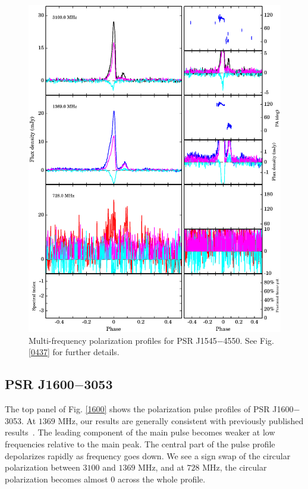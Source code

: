 \documentclass[useAMS,usenatbib]{mn2e}
\begin{document}
\begin{figure}
\begin{center}
\includegraphics[width=6 in]{1545.ps}
\caption{Multi-frequency polarization profiles for PSR J1545$-$4550. 
See Fig. \ref{0437} for further details.}
\label{1545}
\end{center}
\end{figure}

\subsection{PSR J1600$-$3053}

The top panel of Fig. \ref{1600} shows the polarization pulse profiles of 
PSR J1600$-$3053.
%
At $1369$ MHz, our results are generally consistent with previously published
results~\citep{Ord04,Yan11}.
%
The leading component of the main pulse becomes weaker at low frequencies 
relative to the main peak.
%
The central part of the pulse profile depolarizes rapidly as frequency goes 
down. 
%
We see a sign swap of the circular polarization between $3100$ and 
$1369$ MHz, and at $728$ MHz, the circular polarization becomes almost 
$0$ across the whole profile.
\end{document}

